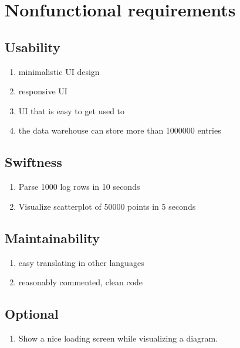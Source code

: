 \section{Nonfunctional requirements}

\renewcommand{\theenumi}{/NF\arabic{enumi}0/}
\renewcommand{\labelenumi}{\theenumi}


\subsection{Usability}

\begin{enumerate}
  \item minimalistic UI design
  \item responsive UI
  \item UI that is easy to get used to
  
  \item the data warehouse can store more than 1000000 entries
\end{enumerate}

\subsection{Swiftness}

\begin{enumerate}[resume] %
	\item Parse 1000 log rows in 10 seconds
	\item Visualize scatterplot of 50000 points in 5 seconds
\end{enumerate}

\subsection{Maintainability}

\begin{enumerate}[resume]
  \item easy translating in other languages
  \item reasonably commented, clean code
\end{enumerate}


\subsection{Optional}

\begin{enumerate}[resume]
  \item Show a nice loading screen while visualizing a diagram. %
\end{enumerate}